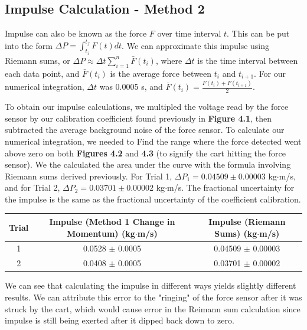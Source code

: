 \documentclass[11pt]{report}
\begin{document}
\subsection*{Impulse Calculation - Method 2}
Impulse can also be known as the force \(F\) over time interval \(t\).  This can
be put into the form \(\Delta P = \int_{t_i}^{t_f} F(t)dt\).  We can approximate
this impulse using Riemann sums, or \(\Delta P \approx \Delta t
\sum_{i=1}^{n}\bar{F}(t_i)\), where $\Delta t$ is the time interval between each
data point, and \(\bar{F}(t_i)\) is the average force between $t_i$ and
$t_{i+1}$.  For our numerical integration, $\Delta t$ was 0.0005 s, and \(\bar{F}(t_i) =
\frac{F(t_i) + F(t_{i+1})}{2}\).

To obtain our impulse calculations, we multipled the voltage read by the force
sensor by our calibration coefficient found previously in \textbf{Figure 4.1},
then subtracted the average background noise of the force sensor.  To calculate
our numerical integration, we needed to Find the range where the force detected 
went above zero on both \textbf{Figures 4.2} and \textbf{4.3} (to signify the cart hitting the
force sensor). We the calculated the area under the curve with the formula involving
Riemann sums derived previously.  For Trial 1, \(\Delta P_1 = 0.04509 \pm
0.00003\) kg$\cdot$m/s, and for Trial 2, \(\Delta P_2 = 0.03701 \pm 0.00002\) kg$\cdot$m/s.  
The fractional uncertainty for the impulse is the same as the fractional 
uncertainty of the coefficient calibration.

\begin{center}
    \begin{tabular}{| c | c | c |}
        \hline
        Trial & Impulse (Method 1 Change in Momentum) (kg$\cdot$m/s) & Impulse
        (Riemann Sums) (kg$\cdot$m/s) \\
        \hline
        1 & 0.0528 $\pm$ 0.0005 & 0.04509 $\pm$ 0.00003 \\
        \hline
        2 & 0.0408 $\pm$ 0.0005 & 0.03701 $\pm$ 0.00002 \\
        \hline
    \end{tabular}
\end{center}

We can see that calculating the impulse in different ways yields slightly
different results.  We can attribute this error to the "ringing" of the force
sensor after it was struck by the cart, which would cause error in the Reimann
sum calculation since impulse is still being exerted after it dipped back down
to zero.
\end{document}
